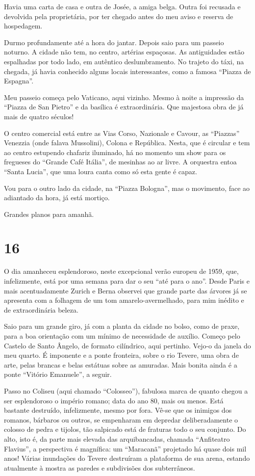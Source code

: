 Havia uma carta de casa e outra de Josée, a amiga belga. Outra foi recusada e devolvida pela proprietária, por ter chegado antes do meu aviso e reserva de hospedagem.

Durmo profundamente até a hora do jantar. Depois saio para um passeio noturno. A cidade não tem, no centro, artérias espaçosas. As antiguidades estão espalhadas por todo lado, em autêntico deslumbramento. No trajeto do táxi, na chegada, já havia conhecido alguns locais interessantes, como a famosa ``Piazza de Espagna''.

Meu passeio começa pelo Vaticano, aqui vizinho. Mesmo à noite a impressão da ``Piazza de San Pietro'' e da basílica é extraordinária. Que majestosa obra de já mais de quatro séculos!

O centro comercial está entre as Vias Corso, Nazionale e Cavour, as ``Piazzas'' Venezzia (onde falava Mussolini), Colona e República. Nesta, que é circular e tem ao centro estupendo chafariz iluminado, há no momento um show para os fregueses do ``Grande Café Itália'', de mesinhas ao ar livre. A orquestra entoa ``Santa Lucia'', que uma loura canta como só esta gente é capaz.

Vou para o outro lado da cidade, na ``Piazza Bologna'', mas o movimento, face ao adiantado da hora, já está mortiço.

Grandes planos para amanhã.

\section*{16 \adfflatleafright {}}
O dia amanheceu esplendoroso, neste excepcional verão europeu de 1959, que, infelizmente, está por uma semana para dar o seu ``até para o ano''. Desde Paris e mais acentuadamente Zurich e Berna observei que grande parte das árvores já se apresenta com a folhagem de um tom amarelo-avermelhado, para mim inédito e de extraordinária beleza.

Saio para um grande giro, já com a planta da cidade no bolso, como de praxe, para a boa orientação com um mínimo de necessidade de auxílio. Começo pelo Castelo de Santo Ângelo, de formato cilíndrico, aqui pertinho. Vejo-o da janela do meu quarto. É imponente e a ponte fronteira, sobre o rio Tevere, uma obra de arte, pelas brancas e belas estátuas sobre as amuradas. Mais bonita ainda é a ponte ``Vitório Emanuele'', a seguir.

Passo no Coliseu (aqui chamado ``Colosseo''), fabulosa marca de quanto chegou a ser esplendoroso o império romano; data do ano 80, mais ou menos. Está bastante destruído, infelizmente, mesmo por fora. Vê-se que os inimigos dos romanos, bárbaros ou outros, se empenharam em depredar deliberadamente o colosso de pedra e tijolos, tão salpicado está de fraturas todo o seu conjunto. Do alto, isto é, da parte mais elevada das arquibancadas, chamada ``Anfiteatro Flavius'', a perspectiva é magnífica: um ``Maracanã'' projetado há quase dois mil anos! Várias inundações do Tevere destruíram a plataforma de sua arena, estando atualmente à mostra as paredes e subdivisões dos subterrâneos.

